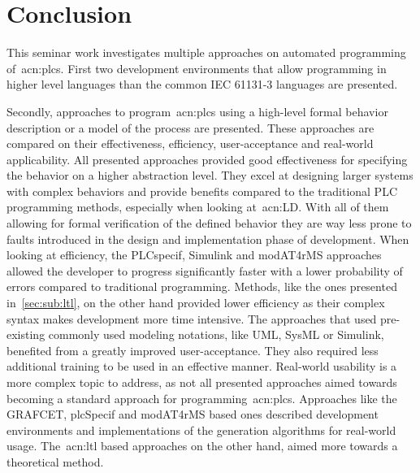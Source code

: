 \chapter{Conclusion}
\label{sec:conclusion}

This seminar work investigates multiple approaches on automated programming of~\acrlong{acn:plc}s.
First two development environments that allow programming in higher level languages than the common IEC 61131-3 languages are presented.

Secondly, approaches to program~\acrshort{acn:plc}s using a high-level formal behavior description or a model of the process are presented.
These approaches are compared on their effectiveness, efficiency, user-acceptance and real-world applicability.
All presented approaches provided good effectiveness for specifying the behavior on a higher abstraction level.
They excel at designing larger systems with complex behaviors and provide benefits compared to the traditional PLC programming methods, especially when looking at~\acrshort{acn:LD}.
With all of them allowing for formal verification of the defined behavior they are way less prone to faults introduced in the design and implementation phase of development.
When looking at efficiency, the PLCspecif, Simulink and modAT4rMS approaches allowed the developer to progress significantly faster with a lower probability of errors compared to traditional programming.
Methods, like the ones presented in~\ref{sec:sub:ltl}, on the other hand provided lower efficiency as their complex syntax makes development more time intensive.
The approaches that used pre-existing commonly used modeling notations, like UML, SysML or Simulink, benefited from a greatly improved user-acceptance.
They also required less additional training to be used in an effective manner.
Real-world usability is a more complex topic to address, as not all presented approaches aimed towards becoming a standard approach for programming~\acrshort{acn:plc}s.
Approaches like the GRAFCET,  plcSpecif and modAT4rMS based ones described development environments and implementations of the generation algorithms for real-world usage.
The~\acrshort{acn:ltl} based approaches on the other hand, aimed more towards a theoretical method.

